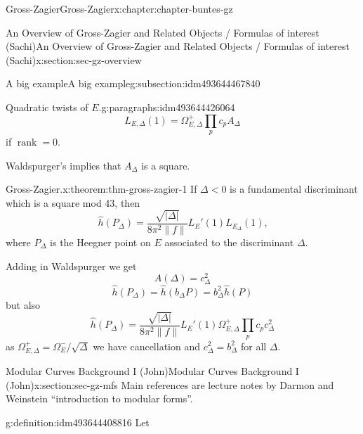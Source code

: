 \documentclass[oneside,10pt,]{book}
\numberwithin{equation}{section}
\DeclareMathOperator{\rank}{rank}
\newcommand{\lt}{<}
\begin{document}
\begin{chapterptx}{Gross-Zagier}{}{Gross-Zagier}{}{}{x:chapter:chapter-buntes-gz}
\begin{sectionptx}{An Overview of Gross-Zagier and Related Objects \slash{} Formulas of interest (Sachi)}{}{An Overview of Gross-Zagier and Related Objects \slash{} Formulas of interest (Sachi)}{}{}{x:section:sec-gz-overview}
\begin{subsectionptx}{A big example}{}{A big example}{}{}{g:subsection:idm493644467840}
\begin{paragraphs}{Quadratic twists of \(E\).}{g:paragraphs:idm493644426064}
\begin{equation*}
L_{E,\Delta } (1) = \Omega _{E,\Delta }^+  \prod_p c_p A_\Delta
\end{equation*}
if \(\rank = 0\).%
\par
Waldspurger's implies that \(A_\Delta \) is a square.%
\end{paragraphs}%
\begin{theorem}{Gross-Zagier.}{}{x:theorem:thm-gross-zagier-1}%
If \(\Delta \lt  0 \) is a fundamental discriminant which is a square mod 43, then%
\begin{equation*}
\hat h(P_\Delta ) = \frac{\sqrt{|\Delta |}}{8\pi ^2 \| f\|} L_E'(1) L_{E_\Delta }(1)\text{,}
\end{equation*}
where \(P_\Delta \) is the Heegner point on \(E\) associated to the discriminant \(\Delta \).%
\end{theorem}
Adding in Waldspurger we get%
\begin{equation*}
A(\Delta ) = c_\Delta ^2
\end{equation*}
%
\begin{equation*}
\hat h(P_\Delta )= \hat h(b_\Delta  P) = b_\Delta ^2\hat h(P)
\end{equation*}
but also%
\begin{equation*}
\hat h(P_\Delta ) = \frac{\sqrt{|\Delta |}}{8\pi ^2 \| f\|} L_E'(1) \Omega _{E,\Delta }^+ \prod_p c_p c_\Delta^2
\end{equation*}
as \(\Omega _{E,\Delta }^+ = \Omega _E^-  / \sqrt \Delta \) we have cancellation and \(c_\Delta ^2 = b_\Delta ^2\) for all \(\Delta \).%
\end{subsectionptx}
\end{sectionptx}
%
%
\typeout{************************************************}
\typeout{************************************************}
%
\begin{sectionptx}{Modular Curves Background I (John)}{}{Modular Curves Background I (John)}{}{}{x:section:sec-gz-mfs}
Main references are lecture notes by Darmon and Weinstein ``introduction to modular forms''.%
\begin{definition}{}{g:definition:idm493644408816}%
Let%
\begin{equation*}

\end{equation*}
\end{definition}
\end{sectionptx}
\end{chapterptx}
\end{document}
